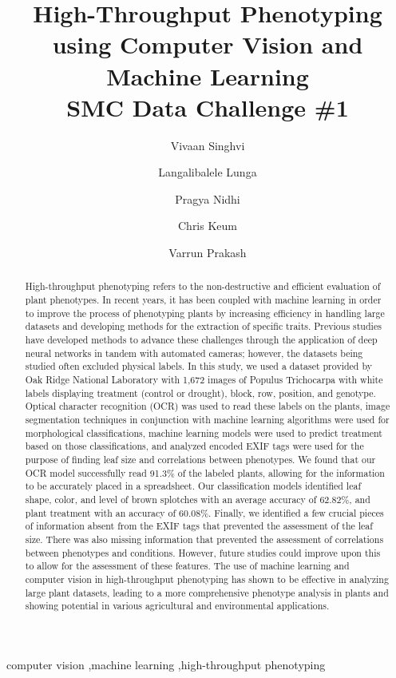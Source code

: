 \documentclass[final,5p,times,twocolumn,authoryear]{elsarticle}
\begin{document}
\begin{frontmatter}

\title{
High-Throughput Phenotyping using Computer Vision and Machine Learning \\
\large SMC Data Challenge \#1
}

\author[]{Vivaan Singhvi}
\author[]{Langalibalele Lunga}
\author[]{Pragya Nidhi}
\author[]{Chris Keum}
\author[]{Varrun Prakash}

\begin{abstract}
High-throughput phenotyping refers to the non-destructive and efficient evaluation of plant phenotypes. In recent years, it has been coupled with machine learning in order to improve the process of phenotyping plants by increasing efficiency in handling large datasets and developing methods for the extraction of specific traits. Previous studies have developed methods to advance these challenges through the application of deep neural networks in tandem with automated cameras; however, the datasets being studied often excluded physical labels. In this study, we used a dataset provided by Oak Ridge National Laboratory with 1,672 images of Populus Trichocarpa with white labels displaying treatment (control or drought), block, row, position, and genotype. Optical character recognition (OCR) was used to read these labels on the plants, image segmentation techniques in conjunction with machine learning algorithms were used for morphological classifications, machine learning models were used to predict treatment based on those classifications, and analyzed encoded EXIF tags were used for the purpose of finding leaf size and correlations between phenotypes. We found that our OCR model successfully read 91.3\% of the labeled plants, allowing for the information to be accurately placed in a spreadsheet. Our classification models identified leaf shape, color, and level of brown splotches with an average accuracy of 62.82\%, and plant treatment with an accuracy of 60.08\%. Finally, we identified a few crucial pieces of information absent from the EXIF tags that prevented the assessment of the leaf size. There was also missing information that prevented the assessment of correlations between phenotypes and conditions. However, future studies could improve upon this to allow for the assessment of these features. The use of machine learning and computer vision in high-throughput phenotyping has shown to be effective in analyzing large plant datasets, leading to a more comprehensive phenotype analysis in plants and showing potential in various agricultural and environmental applications.
\end{abstract}

\begin{keyword}
computer vision \sep machine learning \sep high-throughput phenotyping
\end{keyword}

\end{frontmatter}
\end{document}
